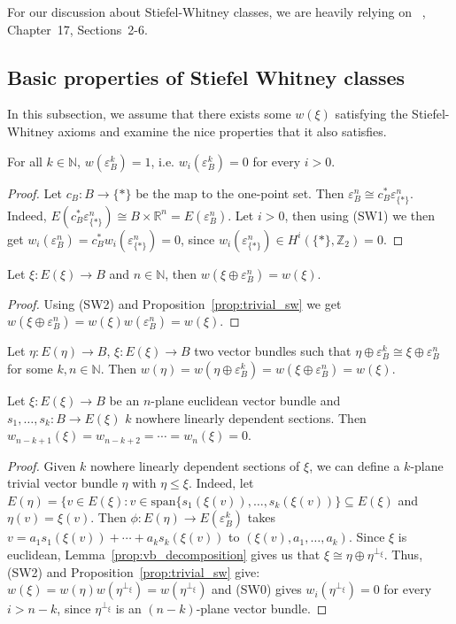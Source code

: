 For our discussion about Stiefel-Whitney classes, we are heavily relying on ~\cite{husemoller}, Chapter~17, Sections~2-6.

\subsection{Basic properties of Stiefel Whitney classes}
In this subsection, we assume that there exists some $w(\xi)$ satisfying the Stiefel-Whitney axioms and examine the nice properties that it also satisfies.
\begin{proposition}\label{prop:trivial_sw} For all $k\in\mathbb{N}$, $w(\varepsilon_B^k)=1$, i.e. $w_i(\varepsilon_B^k)=0$ for every $i>0$.
\end{proposition}
\begin{proof} Let $c_B:B\to\{*\}$ be the map to the one-point set. Then $\varepsilon_B^n\cong c_B^*\varepsilon_{\{*\}}^n$. Indeed, $E(c_B^*\varepsilon_{\{*\}}^n)\cong B\times\mathbb{R}^n=E(\varepsilon_B^n)$. Let $i>0$, then using (SW1) we then get $w_i(\varepsilon_B^n)=c_B^*w_i(\varepsilon_{\{*\}}^n)=0$, since $w_i(\varepsilon_{\{*\}}^n)\in H^i(\{*\},\mathbb{Z}_2)=0$.
\end{proof}

\begin{proposition} Let $\xi:E(\xi)\to B$ and $n\in\mathbb{N}$, then $w(\xi\oplus\varepsilon_B^n)=w(\xi)$.
\end{proposition}
\begin{proof} Using (SW2) and Proposition~\ref{prop:trivial_sw} we get $w(\xi\oplus\varepsilon_B^n)=w(\xi)w(\varepsilon_B^n)=w(\xi)$.
\end{proof}

\begin{corollary} Let $\eta:E(\eta)\to B$, $\xi:E(\xi)\to B$ two vector bundles such that $\eta\oplus\varepsilon_B^k\cong\xi\oplus\varepsilon_B^n$ for some $k,n\in\mathbb{N}$. Then $w(\eta)=w(\eta\oplus\varepsilon_B^k)=w(\xi\oplus\varepsilon_B^n)=w(\xi)$.
\end{corollary}

\begin{proposition} Let $\xi:E(\xi)\to B$ be an $n$-plane euclidean vector bundle and $s_1,\ldots,s_k:B\to E(\xi)$ $k$ nowhere linearly dependent sections. Then $w_{n-k+1}(\xi)=w_{n-k+2}=\cdots=w_n(\xi)=0$.
\end{proposition}
\begin{proof} Given $k$ nowhere linearly dependent sections of $\xi$, we can define a $k$-plane trivial vector bundle $\eta$ with $\eta\leq\xi$. Indeed, let $E(\eta)=\big\{v\in E(\xi):v\in\mathrm{span}\{s_1(\xi(v)),\ldots,s_k(\xi(v))\}\subseteq E(\xi)$ and $\eta(v)=\xi(v)$. Then $\phi:E(\eta)\to E(\varepsilon_B^k)$ takes $v=a_1s_1(\xi(v))+\cdots+a_ks_k(\xi(v))$ to $(\xi(v),a_1,\ldots,a_k)$. Since $\xi$ is euclidean, Lemma~\ref{prop:vb_decomposition} gives us that $\xi\cong\eta\oplus\eta^{\perp_{\xi}}$. Thus, (SW2) and Proposition~\ref{prop:trivial_sw} give: $w(\xi)=w(\eta)w(\eta^{\perp_{\xi}})=w(\eta^{\perp_{\xi}})$ and (SW0) gives $w_i(\eta^{\perp_{\xi}})=0$ for every $i>n-k$, since $\eta^{\perp_{\xi}}$ is an $(n-k)$-plane vector bundle.
\end{proof}

